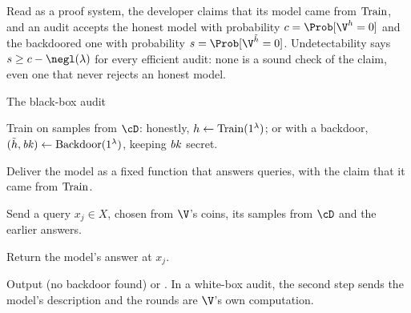 \begin{refsection}

Read as a proof system, the developer claims that its model came from $\mathrm{Train}$, and an audit accepts the honest model with probability $c=\Prob[\V^h=0]$ and the backdoored one with probability $s=\Prob[\V^{\tilde h}=0]$. Undetectability says $s\ge c-\negl(\lambda)$ for every efficient audit: none is a sound check of the claim, even one that never rejects an honest model.

\begin{protocol}{The black-box audit}\label{prot:backdoors:audit}
\item[\act{P}] Train on samples from $\cD$: honestly, $h\leftarrow\mathrm{Train}(1^\lambda)$; or with a backdoor, $(\tilde h,\mathit{bk})\leftarrow\mathrm{Backdoor}(1^\lambda)$, keeping $\mathit{bk}$ secret.
\item[\msg{P}{V}] Deliver the model as a fixed function that answers queries, with the claim that it came from $\mathrm{Train}$.
\item[\msg{V}{P}] Send a query $x_j\in X$, chosen from $\V$'s coins, its samples from $\cD$ and the earlier answers.
\item[\msg{P}{V}] Return the model's answer at $x_j$.
\item[\act{V}] Output \acc{} (no backdoor found) or \rej. In a white-box audit, the second step sends the model's description and the rounds are $\V$'s own computation.
\end{protocol}


\end{refsection}
